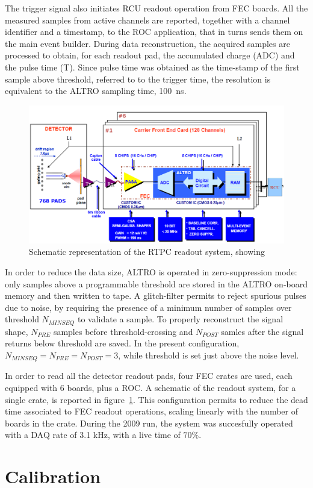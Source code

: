 \documentclass[twocolumn,showpacs,superscriptaddress,groupedaddress]{revtex4}
\begin{document}
The trigger signal also initiates RCU readout operation from FEC boards. All 
the measured samples from active channels are reported, together with a channel 
identifier and a timestamp, to the ROC application, that in turns sends them on 
the main event builder. During data reconstruction, the acquired samples are 
processed to obtain, for each readout pad, the accumulated charge (ADC) and 
the pulse time (T). Since pulse time was obtained as the time-stamp of the 
first sample above threshold, referred to to the trigger time, the resolution 
is equivalent to the ALTRO sampling time, 100~ns.

\begin{figure}[tb]
   \centering
   \includegraphics[width=.5\textwidth]{fig/ReadoutScheme.png}
   \caption[]{Schematic representation of the RTPC readout system, showing} 
   \label{fig:ReadoutScheme}
\end{figure}

In order to reduce the data size, ALTRO is operated in zero-suppression mode: 
only samples above a programmable threshold are stored in the ALTRO on-board 
memory and then written to tape. A glitch-filter permits to reject spurious 
pulses due to noise, by requiring the presence of a minimum number of samples 
over threshold $N_{MINSEQ}$ to validate a sample. To properly reconstruct 
the signal shape, $N_{PRE}$ samples before threshold-crossing and $N_{POST}$ 
samles after the signal returns below threshold are saved. In the present 
configuration, $N_{MINSEQ}=N_{PRE}=N_{POST}=3$, while threshold is set 
just above the noise level. 

In order to read all the detector readout pads, four FEC crates are used, 
each equipped with 6 boards, plus a ROC. A schematic of the readout system, 
for a single crate, is reported in figure~\ref{fig:ReadoutScheme}. This 
configuration permits to reduce the dead time associated to FEC readout 
operations, scaling linearly with the number of boards in the crate. During 
the 2009 run, the system was succesfully operated with a DAQ rate of 3.1 kHz, 
with a live time of $70 \%$.

\section{Calibration} \label{sec_calib}
\end{document}
